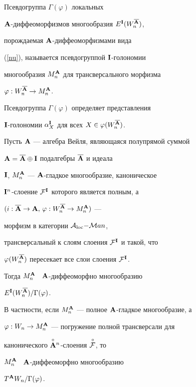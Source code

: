  





\begin{defnnonum}


Псевдогруппа $\Gamma(\varphi)$ локальных


${\bold A}$-диффеоморфизмов многообразия $E^{\bold I}(W^{\overline{{\bold A}}}_n)$,


порождаемая ${\bold A}$-диффеоморфизмами вида


(\ref{nu}), называется псевдогруппой ${\bold I}$-голономии


многообразия $M^{\bold A}_n$ для трансверсального морфизма


$\varphi: W^{\overline{{\bold A}}}_n\to M^{\bold A}_n$.


\end{defnnonum}





 


Псевдогруппа $\Gamma(\varphi)$ определяет представления


${\bold I}$-голономии $\alpha^{\bold I}_X$ для всех $X\in\varphi(W^{\overline{{\bold A}}}_n)$.











\begin{thm}


Пусть ${\bold A}$ --- алгебра Вейля, являющаяся полупрямой суммой


${\bold A}=\overline{{\bold A}}\oplus{\bold I}$ подалгебры $\overline{{\bold A}}$ и идеала


${\bold I}$, $M^{\bold A}_n$ --- ${\bold A}$-гладкое многообразие, каноническое


${\bold I}^n$-слоение ${\cal F}^{{\bold I}}$ которого является полным, а


$(i:\overline{{\bold A}}\to{\bold A},\,\varphi: W^{\overline{{\bold A}}}_n\to M^{\bold A}_n)$ ---


морфизм в категории ${\cal A}_{\operatorname{loc}}{-}{\cal M}an$,


трансверсальный к слоям слоения ${\cal F}^{\bold I}$ и такой, что


$\varphi(W^{\overline{{\bold A}}}_n)$ пересекает все слои слоения ${\cal F}^{\bold I}$.


Тогда $M^{\bold A}_n$ \ ${\bold A}$-диффеоморфно многообразию


$E^{\bold I}(W^{\overline{{\bold A}}}_n)/\Gamma(\varphi)$.


 


В частности, если $M^{\bold A}_n$ --- полное ${\bold A}$-гладкое многообразие, а


$\varphi: W_n\to M^{\bold A}_n$ --- погружение полной трансверсали для


канонического $\overset{\circ}{{\bold A}}{}^n$-слоения $\overset{\,\circ}{\cal F}{}$, то


$M^{\bold A}_n$ \ ${\bold A}$-диффеоморфно многообразию


$T^{{\bold A}}W_n/\Gamma(\varphi)$.


\end{thm}


